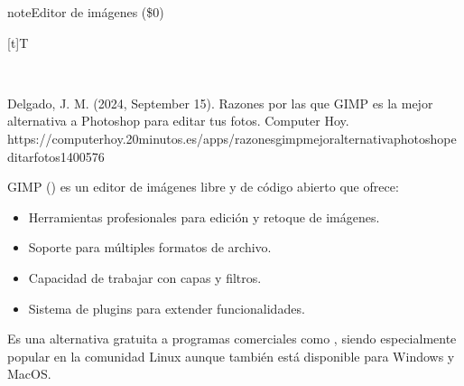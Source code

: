 \documentclass[letterpaper,10pt,spanish]{sphinxmanual}
\let\sphinxpxdimen\pdfpxdimen\else\newdimen\sphinxpxdimen
\begin{document}
\begin{sphinxadmonition}{note}{Editor de imágenes  (\$0)}


\begin{savenotes}\sphinxattablestart
\sphinxthistablewithglobalstyle
\centering
\begin{tabulary}{\linewidth}[t]{T}
\sphinxtoprule
\sphinxtableatstartofbodyhook

\begin{sphinxfigure-in-table}
\centering
\capstart
\noindent\sphinxincludegraphics[width=300\sphinxpxdimen]{{image033}.png}
\label{\detokenize{1_guias/10ofimatica/G1012:id43}}\end{sphinxfigure-in-table}\relax
\\
\sphinxbottomrule
\end{tabulary}
\sphinxtableafterendhook\par
\sphinxattableend\end{savenotes}

\sphinxAtStartPar
%
\begin{footnote}[5]\sphinxAtStartFootnote
Delgado, J. M. (2024, September 15). Razones por las que GIMP es la mejor alternativa a Photoshop para editar tus fotos. Computer Hoy. https://computerhoy.20minutos.es/apps/razones\sphinxhyphen{}gimp\sphinxhyphen{}mejor\sphinxhyphen{}alternativa\sphinxhyphen{}photoshop\sphinxhyphen{}editar\sphinxhyphen{}fotos\sphinxhyphen{}1400576
%
\end{footnote} GIMP () es un editor de imágenes libre y de código abierto que ofrece:
\begin{itemize}
\item {} 
\sphinxAtStartPar
Herramientas profesionales para edición y retoque de imágenes.

\item {} 
\sphinxAtStartPar
Soporte para múltiples formatos de archivo.

\item {} 
\sphinxAtStartPar
Capacidad de trabajar con capas y filtros.

\item {} 
\sphinxAtStartPar
Sistema de plugins para extender funcionalidades.

\end{itemize}

\sphinxAtStartPar
Es una alternativa gratuita a programas comerciales como , siendo especialmente popular en la comunidad Linux aunque también está disponible para Windows y MacOS.
\end{sphinxadmonition}
\end{document}
